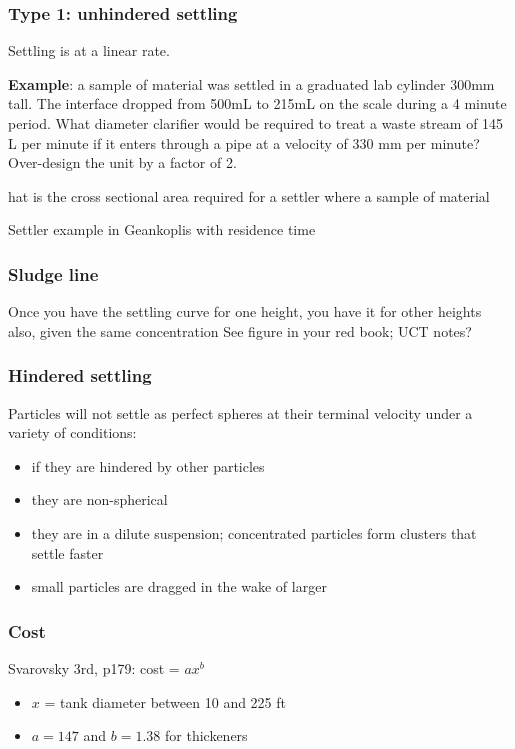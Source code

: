 \begin{frame}\frametitle{Type 1: unhindered settling}
	Settling is at a linear rate.
	
	\vspace{12pt}
	
	\textbf{Example}: a sample of material was settled in a graduated lab cylinder 300mm tall. The interface dropped from 500mL to 215mL on the scale during a 4 minute period. What diameter clarifier would be required to treat a waste stream of 145 L per minute if it enters through a pipe at a velocity of 330 mm per minute? 	
	Over-design the unit by a factor of 2.
	
	
	
	hat is the cross sectional area required for a settler where a sample of material
	
	Settler example in Geankoplis with residence time 
	
	
\end{frame}

\begin{frame}\frametitle{Sludge line}
	Once you have the settling curve for one height, you have it for other heights also, given the same concentration
	See figure in your red book; UCT notes?
	
\end{frame}

\begin{frame}\frametitle{Hindered settling}
	Particles will not settle as perfect spheres at their terminal velocity under a variety of conditions:
	\begin{itemize}
		\item	if they are hindered by other particles
		\item	they are non-spherical
		\item	they are in a dilute suspension; concentrated particles form clusters that settle faster
		\item	small particles are dragged in the wake of larger
	\end{itemize}
\end{frame}

\begin{frame}\frametitle{Cost}
	Svarovsky 3rd, p179: cost = $a x^b$
	\begin{itemize}
		\item	$x$ = tank diameter between 10 and 225 ft
		\item	$a=147$ and $b=1.38$ for thickeners
	\end{itemize}
\end{frame}

